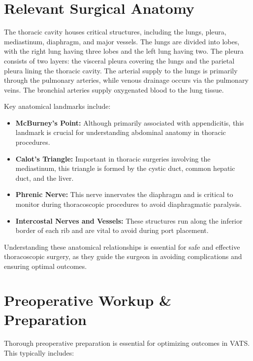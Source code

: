 \section*{Relevant Surgical Anatomy}
The thoracic cavity houses critical structures, including the lungs, pleura, mediastinum, diaphragm, and major vessels. The lungs are divided into lobes, with the right lung having three lobes and the left lung having two. The pleura consists of two layers: the visceral pleura covering the lungs and the parietal pleura lining the thoracic cavity. The arterial supply to the lungs is primarily through the pulmonary arteries, while venous drainage occurs via the pulmonary veins. The bronchial arteries supply oxygenated blood to the lung tissue.

Key anatomical landmarks include:

\begin{itemize}
  \item \textbf{McBurney's Point:} Although primarily associated with appendicitis, this landmark is crucial for understanding abdominal anatomy in thoracic procedures.
  \item \textbf{Calot's Triangle:} Important in thoracic surgeries involving the mediastinum, this triangle is formed by the cystic duct, common hepatic duct, and the liver.
  \item \textbf{Phrenic Nerve:} This nerve innervates the diaphragm and is critical to monitor during thoracoscopic procedures to avoid diaphragmatic paralysis.
  \item \textbf{Intercostal Nerves and Vessels:} These structures run along the inferior border of each rib and are vital to avoid during port placement.
\end{itemize}

Understanding these anatomical relationships is essential for safe and effective thoracoscopic surgery, as they guide the surgeon in avoiding complications and ensuring optimal outcomes.

\section*{Preoperative Workup \& Preparation}
Thorough preoperative preparation is essential for optimizing outcomes in VATS. This typically includes:

